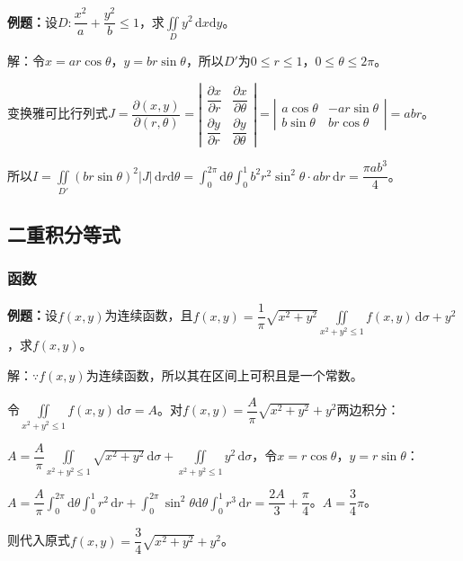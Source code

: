 \textbf{例题：}设$D:\dfrac{x^2}{a}+\dfrac{y^2}{b}\leqslant1$，求$\iint\limits_Dy^2\,\textrm{d}x\textrm{d}y$。

解：令$x=ar\cos\theta$，$y=br\sin\theta$，所以$D'$为$0\leqslant r\leqslant 1$，$0\leqslant\theta\leqslant2\pi$。

变换雅可比行列式$J=\dfrac{\partial(x,y)}{\partial(r,\theta)}=\left\vert\begin{array}{cc}
    \dfrac{\partial x}{\partial r} & \dfrac{\partial x}{\partial\theta} \\
    \dfrac{\partial y}{\partial r} & \dfrac{\partial y}{\partial\theta}
\end{array}\right\vert=\left\vert\begin{array}{cc}
    a\cos\theta & -ar\sin\theta \\
    b\sin\theta & br\cos\theta
\end{array}\right\vert=abr$。

所以$I=\iint\limits_{D'}(br\sin\theta)^2\vert J\vert\,\textrm{d}r\textrm{d}\theta=\int_0^{2\pi}\textrm{d}\theta\int_0^1b^2r^2\sin^2\theta\cdot abr\,\textrm{d}r=\dfrac{\pi ab^3}{4}$。

\subsection{二重积分等式}

\subsubsection{函数}

\textbf{例题：}设$f(x,y)$为连续函数，且$f(x,y)=\dfrac{1}{\pi}\sqrt{x^2+y^2}\iint\limits_{x^2+y^2\leqslant1}f(x,y)\,\textrm{d}\sigma+y^2$，求$f(x,y)$。

解：$\because f(x,y)$为连续函数，所以其在区间上可积且是一个常数。

令$\iint\limits_{x^2+y^2\leqslant1}f(x,y)\,\textrm{d}\sigma=A$。对$f(x,y)=\dfrac{A}{\pi}\sqrt{x^2+y^2}+y^2$两边积分：

$A=\dfrac{A}{\pi}\iint\limits_{x^2+y^2\leqslant1}\sqrt{x^2+y^2}\,\textrm{d}\sigma+\iint\limits_{x^2+y^2\leqslant1}y^2\,\textrm{d}\sigma$，令$x=r\cos\theta$，$y=r\sin\theta$：

$A=\dfrac{A}{\pi}\int_0^{2\pi}\textrm{d}\theta\int_0^1r^2\,\textrm{d}r+\int_0^{2\pi}\sin^2\theta\textrm{d}\theta\int_0^1r^3\,\textrm{d}r=\dfrac{2A}{3}+\dfrac{\pi}{4}$。$A=\dfrac{3}{4}\pi$。

则代入原式$f(x,y)=\dfrac{3}{4}\sqrt{x^2+y^2}+y^2$。

